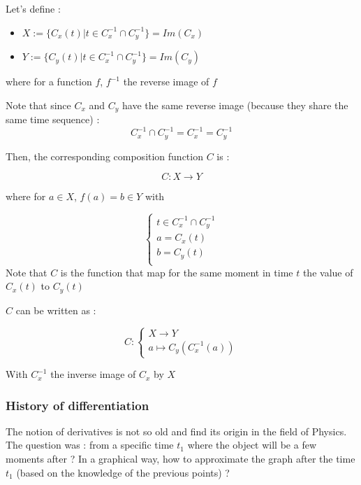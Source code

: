 \documentclass[12pt]{article}
\begin{document}
Let's define :
\begin{itemize}
    \item[] $X := \{{ C_x(t) | t \in C_x^{-1} \cap C_y^{-1} \}} = Im(C_x)$
    \item[] $Y := \{{ C_y(t) | t \in C_x^{-1} \cap C_y^{-1} \}} = Im(C_y)$
\end{itemize}

where for a function $f$, $f^{-1}$ the reverse image of $f$

Note that since $C_x$ and $C_y$ have the same reverse image (because they share the same time sequence) :
$$
C_x^{-1} \cap C_y^{-1} = C_x^{-1} = C_y^{-1}
$$

Then, the corresponding composition function $C$ is :

$$
C: X \rightarrow Y
$$

where for $a \in X$, $f(a)=b \in Y$ with 

$$
\begin{cases}
t \in C_x^{-1} \cap C_y^{-1} \\
a = C_x(t) \\
b = C_y(t) \\
\end{cases}
$$
Note that $C$ is the function that map for the same moment in time $t$ the value of $C_x(t)$ to $C_y(t)$

\bigskip

$C$ can be written as :

$$
C:
\begin{cases}
X \rightarrow Y \\
a \mapsto C_y(C_x^{-1}(a))
\end{cases}
$$

With $C_x^{-1}$ the inverse image of $C_x$ by $X$

\begin{figure}[H]
 \centering
 
\end{figure}


\subsubsection{History of differentiation}

The notion of derivatives is not so old and find its origin in the field of Physics.
The question was : from a specific time $t_1$ where the object will be a few moments after ? In a graphical way, how to approximate the graph after the time $t_1$ (based on the knowledge of the previous points) ?
\end{document}

